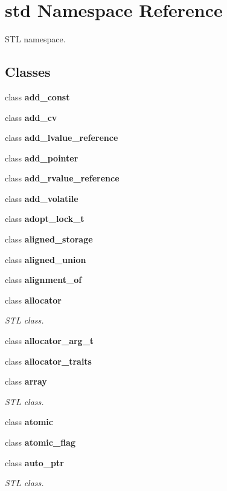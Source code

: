 \hypertarget{namespacestd}{}\section{std Namespace Reference}
\label{namespacestd}


S\+TL namespace.  


\subsection*{Classes}
\begin{DoxyCompactItemize}
\item 
class \textbf{ add\+\_\+const}
\item 
class \textbf{ add\+\_\+cv}
\item 
class \textbf{ add\+\_\+lvalue\+\_\+reference}
\item 
class \textbf{ add\+\_\+pointer}
\item 
class \textbf{ add\+\_\+rvalue\+\_\+reference}
\item 
class \textbf{ add\+\_\+volatile}
\item 
class \textbf{ adopt\+\_\+lock\+\_\+t}
\item 
class \textbf{ aligned\+\_\+storage}
\item 
class \textbf{ aligned\+\_\+union}
\item 
class \textbf{ alignment\+\_\+of}
\item 
class \textbf{ allocator}
\begin{DoxyCompactList}\small\item\em S\+TL class. \end{DoxyCompactList}\item 
class \textbf{ allocator\+\_\+arg\+\_\+t}
\item 
class \textbf{ allocator\+\_\+traits}
\item 
class \textbf{ array}
\begin{DoxyCompactList}\small\item\em S\+TL class. \end{DoxyCompactList}\item 
class \textbf{ atomic}
\item 
class \textbf{ atomic\+\_\+flag}
\item 
class \textbf{ auto\+\_\+ptr}
\begin{DoxyCompactList}\small\item\em S\+TL class. \end{DoxyCompactList}\item 

\end{DoxyCompactItemize}
